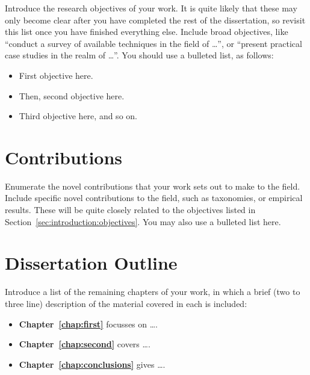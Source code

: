 Introduce the research objectives of your work. It is quite likely that these may only become clear after you have completed the rest of the dissertation, so revisit this list once you have finished everything else. Include broad objectives, like ``conduct a survey of available techniques in the field of \ldots'', or ``present practical case studies in the realm of \ldots''. You should use a bulleted list, as follows:
\begin{itemize}
	\item First objective here.

	\item Then, second objective here.

	\item Third objective here, and so on.
\end{itemize}


\section{Contributions}
\label{sec:introduction:contributions}

Enumerate the novel contributions that your work sets out to make to the field. Include specific novel contributions to the field, such as taxonomies, or empirical results. These will be quite closely related to the objectives listed in Section~\ref{sec:introduction:objectives}. You may also use a bulleted list here.


\section{Dissertation Outline}
\label{sec:introduction:outline}

Introduce a list of the remaining chapters of your work, in which a brief (two to three line) description of the material covered in each is included:
\begin{itemize}
	\item\textbf{Chapter~\ref{chap:first}} focusses on \ldots .
	
	\item\textbf{Chapter~\ref{chap:second}} covers \ldots .
	
	\item\textbf{Chapter~\ref{chap:conclusions}} gives \ldots .
\end{itemize}

